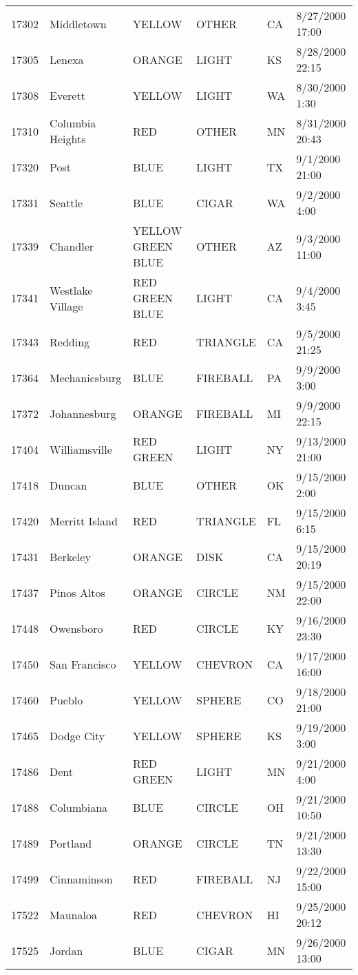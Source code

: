 \begin{tabular}{llllll}
17302 & Middletown & YELLOW & OTHER & CA & 8/27/2000 17:00 \\
17305 & Lenexa & ORANGE & LIGHT & KS & 8/28/2000 22:15 \\
17308 & Everett & YELLOW & LIGHT & WA & 8/30/2000 1:30 \\
17310 & Columbia Heights & RED & OTHER & MN & 8/31/2000 20:43 \\
17320 & Post & BLUE & LIGHT & TX & 9/1/2000 21:00 \\
17331 & Seattle & BLUE & CIGAR & WA & 9/2/2000 4:00 \\
17339 & Chandler & YELLOW GREEN BLUE & OTHER & AZ & 9/3/2000 11:00 \\
17341 & Westlake Village & RED GREEN BLUE & LIGHT & CA & 9/4/2000 3:45 \\
17343 & Redding & RED & TRIANGLE & CA & 9/5/2000 21:25 \\
17364 & Mechanicsburg & BLUE & FIREBALL & PA & 9/9/2000 3:00 \\
17372 & Johannesburg & ORANGE & FIREBALL & MI & 9/9/2000 22:15 \\
17404 & Williamsville & RED GREEN & LIGHT & NY & 9/13/2000 21:00 \\
17418 & Duncan & BLUE & OTHER & OK & 9/15/2000 2:00 \\
17420 & Merritt Island & RED & TRIANGLE & FL & 9/15/2000 6:15 \\
17431 & Berkeley & ORANGE & DISK & CA & 9/15/2000 20:19 \\
17437 & Pinos Altos & ORANGE & CIRCLE & NM & 9/15/2000 22:00 \\
17448 & Owensboro & RED & CIRCLE & KY & 9/16/2000 23:30 \\
17450 & San Francisco & YELLOW & CHEVRON & CA & 9/17/2000 16:00 \\
17460 & Pueblo & YELLOW & SPHERE & CO & 9/18/2000 21:00 \\
17465 & Dodge City & YELLOW & SPHERE & KS & 9/19/2000 3:00 \\
17486 & Dent & RED GREEN & LIGHT & MN & 9/21/2000 4:00 \\
17488 & Columbiana & BLUE & CIRCLE & OH & 9/21/2000 10:50 \\
17489 & Portland & ORANGE & CIRCLE & TN & 9/21/2000 13:30 \\
17499 & Cinnaminson & RED & FIREBALL & NJ & 9/22/2000 15:00 \\
17522 & Maunaloa & RED & CHEVRON & HI & 9/25/2000 20:12 \\
17525 & Jordan & BLUE & CIGAR & MN & 9/26/2000 13:00 \\

\end{tabular}
